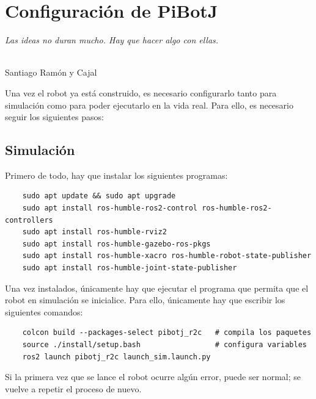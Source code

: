 \chapter{Configuración de PiBotJ}
\label{cap:capitulo9}

\begin{flushright}
\begin{minipage}[]{10cm}
\emph{Las ideas no duran mucho. Hay que hacer algo con ellas.}\\
\end{minipage}\\

Santiago Ramón y Cajal\\
\end{flushright}

\vspace{1cm}

\setcounter{footnote}{136} %
Una vez el robot ya está construido, es necesario configurarlo tanto para simulación como para poder ejecutarlo en la vida real. Para ello, es necesario seguir los siguientes pasos: 

\section{Simulación}
\label{subsec:anexosimulacion}

Primero de todo, hay que instalar los siguientes programas: 

\begin{verbatim}
	sudo apt update && sudo apt upgrade
	sudo apt install ros-humble-ros2-control ros-humble-ros2-controllers
	sudo apt install ros-humble-rviz2
	sudo apt install ros-humble-gazebo-ros-pkgs
	sudo apt install ros-humble-xacro ros-humble-robot-state-publisher 
	sudo apt install ros-humble-joint-state-publisher
\end{verbatim}
 
Una vez instalados, únicamente hay que ejecutar el programa que permita que el robot en simulación se inicialice. Para ello, únicamente hay que escribir los siguientes comandos:
\begin{verbatim}
	colcon build --packages-select pibotj_r2c   # compila los paquetes
	source ./install/setup.bash                 # configura variables 
	ros2 launch pibotj_r2c launch_sim.launch.py
\end{verbatim} 

Si la primera vez que se lance el robot ocurre algún error, puede ser normal; se vuelve a repetir el proceso de nuevo.

